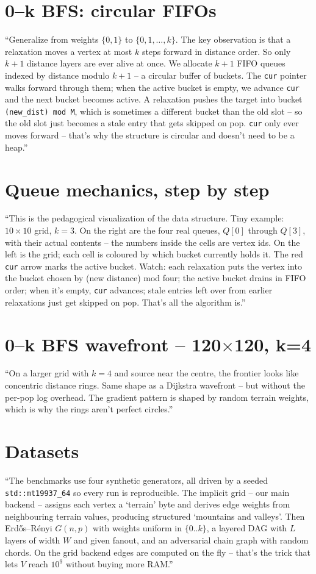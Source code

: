 \documentclass[11pt,a4paper]{article}
\begin{document}
\section{0--k BFS: circular FIFOs}
``Generalize from weights $\{0,1\}$ to $\{0,1,\dots,k\}$. The key
observation is that a relaxation moves a vertex at most $k$ steps
forward in distance order. So only $k{+}1$ distance layers are ever
alive at once. We allocate $k{+}1$ FIFO queues indexed by distance
modulo $k{+}1$ -- a circular buffer of buckets. The \texttt{cur}
pointer walks forward through them; when the active bucket is empty,
we advance \texttt{cur} and the next bucket becomes active. A
relaxation pushes the target into bucket \texttt{(new\_dist) mod M},
which is sometimes a different bucket than the old slot -- so the old
slot just becomes a stale entry that gets skipped on pop.
\texttt{cur} only ever moves forward -- that's why the structure is
circular and doesn't need to be a heap.''
\hrulefill

\section{Queue mechanics, step by step}
``This is the pedagogical visualization of the data structure. Tiny
example: $10\times10$ grid, $k=3$. On the right are the four real
queues, $Q[0]$ through $Q[3]$, with their actual contents -- the
numbers inside the cells are vertex ids. On the left is the grid;
each cell is coloured by which bucket currently holds it. The red
\texttt{cur} arrow marks the active bucket. Watch: each relaxation
puts the vertex into the bucket chosen by (new distance) mod four;
the active bucket drains in FIFO order; when it's empty, \texttt{cur}
advances; stale entries left over from earlier relaxations just get
skipped on pop. That's all the algorithm is.''
\hrulefill

\section{0--k BFS wavefront -- 120$\times$120, k=4}
``On a larger grid with $k=4$ and source near the centre, the
frontier looks like concentric distance rings. Same shape as a
Dijkstra wavefront -- but without the per-pop log overhead. The
gradient pattern is shaped by random terrain weights, which is why
the rings aren't perfect circles.''
\hrulefill

\section{Datasets}
``The benchmarks use four synthetic generators, all driven by a
seeded \texttt{std::mt19937\_64} so every run is reproducible. The
implicit grid -- our main backend -- assigns each vertex a `terrain'
byte and derives edge weights from neighbouring terrain values,
producing structured `mountains and valleys'. Then Erdős--Rényi
$G(n,p)$ with weights uniform in $\{0..k\}$, a layered DAG with $L$
layers of width $W$ and given fanout, and an adversarial chain graph
with random chords. On the grid backend edges are computed on the fly
-- that's the trick that lets $V$ reach $10^9$ without buying more
RAM.''
\hrulefill
\end{document}

